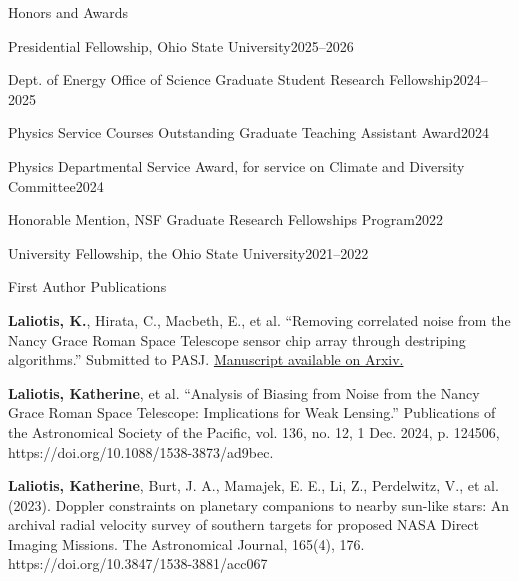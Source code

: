 \documentclass{resume} %
\begin{document}
\begin{rSection}{Honors and Awards}

\begin{rSubsection}{}{}{}{}

\item Presidential Fellowship, Ohio State University\hfill{2025--2026}
\\
\item Dept. of Energy Office of Science Graduate Student Research Fellowship\hfill{2024--2025}
\\
\item Physics Service Courses Outstanding Graduate Teaching Assistant Award\hfill{2024}
\\
\item Physics Departmental Service Award, for service on Climate and Diversity Committee\hfill{2024}
\\
\item Honorable Mention, NSF Graduate Research Fellowships Program\hfill{2022}
\\
\item University Fellowship, the Ohio State University\hfill{2021--2022}
\end{rSubsection}


\end{rSection}


\begin{rSection}{First Author Publications}

\vspace{.3em}

\begin{rSubsection}{}{}{}{}


\item \textbf{Laliotis, K.}, Hirata, C., Macbeth, E., et al. “Removing correlated noise from the Nancy Grace Roman Space Telescope sensor chip array through destriping algorithms.” Submitted to PASJ. \href{https://arxiv.org/abs/2512.05949}{Manuscript available on Arxiv.}
\\

\item \textbf{Laliotis, Katherine}, et al. “Analysis of Biasing from Noise from the Nancy Grace Roman Space Telescope: Implications for Weak Lensing.” Publications of the Astronomical Society of the Pacific, vol. 136, no. 12, 1 Dec. 2024, p. 124506, https://doi.org/10.1088/1538-3873/ad9bec.
\\

\item \textbf{Laliotis, Katherine}, Burt, J. A., Mamajek, E. E., Li, Z., Perdelwitz, V., et al. (2023). Doppler constraints on planetary companions to nearby sun-like stars: An archival radial velocity survey of southern targets for proposed NASA Direct Imaging Missions. The Astronomical Journal, 165(4), 176. https://doi.org/10.3847/1538-3881/acc067 

\end{rSubsection}


\end{rSection}
\end{document}

